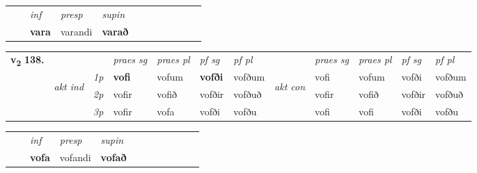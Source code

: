 \begin{tabular}{llllllllllll}
 & & \textit{inf}     & \textit{presp} & \textit{supin}       \\*
  & & \textbf{vara}      & varandi &  \textbf{varað}   \\*
\cmidrule{1-12}
\end{tabular}



\begin{tabular}{llllllllllll} \toprule
\multirow{4}{*}{{{\textbf{v{\textsubscript{2}}} \Large{\textbf{138.}}}}}  & &   &  \textit{praes sg}  & \textit{praes pl}  &\textit{ pf sg} & \textit{pf pl} &  &  \textit{praes sg}  & \textit{praes pl}  & \textit{pf sg} & \textit{pf pl } \\*
	\cmidrule{4-7} \cmidrule{9-12}
 & \multirow{3}{*}{\begin{turn}{90}\textit{akt ind}\end{turn}} & {\textit{1p}} & \textbf{vofi} & vofum    & \textbf{vofði} & vofðum & \multirow{3}{*}{\begin{turn}{90}\textit{akt con}\end{turn}} &vofi & vofum & vofði & vofðum\\*
& &  {\textit{2p}} &  vofir  & vofið   & vofðir & vofðuð & & vofir & vofið & vofðir & vofðuð \\*
& &  {\textit{3p}} & vofir & vofa   & vofði & vofðu & & vofi & vofi& vofði & vofðu  \\*
\cmidrule{4-7} \cmidrule{9-12}
\end{tabular}


\begin{tabular}{llllllllllll}
 & & \textit{inf}     & \textit{presp} & \textit{supin}       \\*
  & & \textbf{vofa}      & vofandi &  \textbf{vofað}   \\*
\cmidrule{1-12}
\end{tabular}



